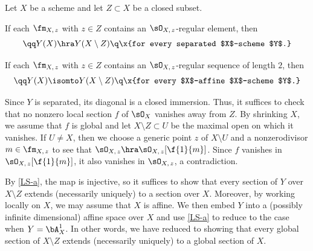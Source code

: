 \blem \label{loc-sections}
Let $X$ be a scheme and let $Z \subset X$ be a closed subset. %
\benum
\item \label{LS-a}
If each $\fm_{X,\, z}$ with $z \in Z$ contains an $\sO_{X,\, z}$-regular element, then
\[
\qq Y(X) \hra Y(X \setminus Z) \q \x{for every separated $X$-scheme $Y$.}
\]

\item \label{LS-b}
If each $\fm_{X,\, z}$ with $z \in Z$ contains an $\sO_{X,\, z}$-regular sequence of length $2$, then
\[
\qq Y(X) \isomto Y(X \setminus Z) \q \x{for every $X$-affine $X$-scheme $Y$.}
\]
\eenum
\elem

\bpf
\benum
\item
Since $Y$ is separated, its diagonal is a closed immersion. Thus, it suffices to check  that no nonzero local section $f$ of $\sO_X$ vanishes away from $Z$. %
By shrinking $X$, we assume that $f$ is global and let $X \setminus Z \subset U$ be the maximal open on which it vanishes. If $U \neq X$, then we choose a generic point $z$ of $X \setminus U$ and a nonzerodivisor $m \in \fm_{X,\, z}$ to see that $\sO_{X,\, z} \hra \sO_{X,\, z}[\f{1}{m}]$. Since $f$ vanishes in $\sO_{X,\, z}[\f{1}{m}]$, it also vanishes in $\sO_{X,\, z}$, a contradiction.

\item
By \ref{LS-a}, the map is injective, so it suffices to show that every section of $Y$ over $X \setminus Z$ extends (necessarily uniquely) to a section over $X$. Moreover, by working locally on $X$, we may assume that $X$ is affine. We then embed $Y$ into a (possibly infinite dimensional) affine space over $X$ and use \ref{LS-a} to reduce to the case when $Y = \bA^1_X$. In other words, we have reduced to showing that every global section of $X \setminus Z$ extends (necessarily uniquely) to a global section of $X$.

